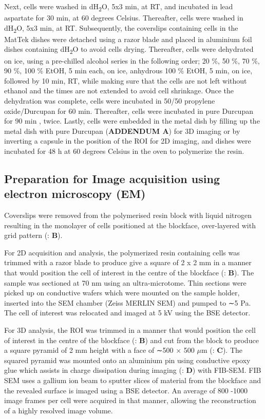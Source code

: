 Next, cells were washed in dH\textsubscript{2}O, 5x3 min, at RT, and incubated in lead aspartate for 30 min, at 60 degrees Celsius. Thereafter, cells were washed in dH\textsubscript{2}O, 5x3 min, at RT. Subsequently, the coverslips containing cells in the MatTek dishes were detached using a razor blade and placed in aluminium foil dishes containing dH\textsubscript{2}O to avoid cells drying. Thereafter,  cells were dehydrated on ice, using a pre-chilled alcohol series in the following order; 20 \%, 50 \%, 70 \%, 90 \%, 100 \% EtOH, 5 min each, on ice, anhydrous 100 \% EtOH, 5 min, on ice, followed by 10 min, RT, while making sure that the cells are not left without ethanol and the times are not extended to avoid cell shrinkage. Once the dehydration was complete, cells were incubated in 50/50 propylene oxide/Durcupan for 60 min. Thereafter, cells were incubated in pure Durcupan for 90 min , twice. Lastly, cells were embedded in the metal dish by filling up the metal dish with pure Durcupan (\textbf{ADDENDUM A}) for 3D imaging or by inverting a capsule in the position of the ROI for 2D imaging, and dishes were incubated for 48 h at 60 degrees Celsius in the oven to polymerize the resin.

\subsection{Preparation for Image acquisition using electron microscopy (EM)} 
Coverslips were removed from the polymerised resin block with liquid nitrogen resulting in the monolayer of cells positioned at the blockface, over-layered with grid pattern (: \textbf{B}). 


For 2D acquisition and analysis, the polymerized resin containing cells was trimmed with a razor blade to produce give a square of 2 x 2 mm in a manner that would position the cell of interest in the centre of the blockface (: \textbf{B}). The sample was sectioned at 70 nm using an ultra-microtome. Thin sections were picked up on conductive wafers which were mounted on the sample holder, inserted into the SEM chamber (Zeiss MERLIN SEM) and pumped to ∼5 Pa. The cell of interest was relocated and imaged at 5 kV using the BSE detector. 

For 3D analysis, the ROI was trimmed in a manner that would position the cell of interest in the centre of the blockface (: \textbf{B}) and cut from the block to produce a square pyramid of 2 mm height with a face of ∼500 × 500 $\mu$m (: \textbf{C}). The squared pyramid was mounted onto an aluminium pin using conductive epoxy glue which assists in charge dissipation during imaging (: \textbf{D}) with FIB-SEM. FIB SEM uses a gallium ion beam to sputter slices of material from the blockface and the revealed surface is imaged using a BSE detector. An average of 800 -1000 image frames per cell were acquired in that manner, allowing the reconstruction of a highly resolved image volume. 

